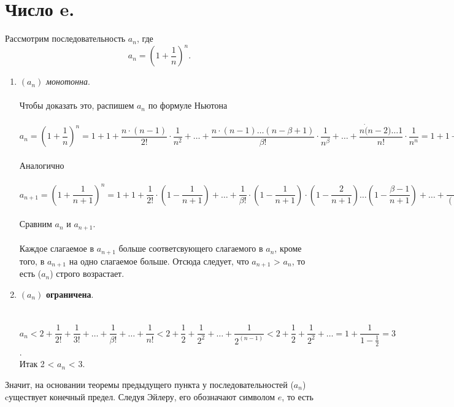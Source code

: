 \section{Число e.}
Рассмотрим последовательность $a_{n}$, где
$$a_{n} = (1 + \dfrac{1}{n})^n.$$
\begin{enumerate}
	\item $(a_{n})$ \textit{монотонна}.\\\\ Чтобы доказать это, распишем $a_{n}$ по формуле Ньютона\\
	\\$a_{n} = (1 + \dfrac{1}{n})^n  = 1 + 1 + \dfrac{n\cdot(n -1)}{2!}\cdot\dfrac{1}{n^2} + \ldots + \dfrac{n\cdot(n - 1)\dots(n- \beta + 1)}{\beta!}\cdot\dfrac{1}{n^\beta} + \ldots + \dfrac{n\dot(n-2)\dots 1}{n!}\cdot\dfrac{1}{n^n} = 1 + 1 + \dfrac{1}{2!} \cdot(1 - \dfrac{1}{n}) + \ldots + \dfrac{1}{\beta!}\cdot(1-\dfrac{1}{n})\cdot(1-\dfrac{2}{n})\dots(1-\dfrac{\beta - 1}{n}) + \ldots + \dfrac{1}{n!}\cdot(1-\dfrac{1}{n})\cdot(1-\dfrac{2}{n}) \dots (1-\dfrac{n - 1}{n})$\\
	\\
	Аналогично\\
	\\$a_{n+1} =(1 + \dfrac{1}{n + 1})^n = 1 + 1 + \dfrac{1}{2!} \cdot(1 - \dfrac{1}{n + 1}) + \ldots + \dfrac{1}{\beta!}\cdot(1-\dfrac{1}{n + 1})\cdot(1-\dfrac{2}{n + 1})\dots(1-\dfrac{\beta - 1}{n + 1}) + \ldots + \dfrac{1}{(n + 1)!}\cdot(1-\dfrac{1}{n + 1}) \dots (1-\dfrac{n}{n +1}) $\\
	\\
	Сравним $a_{n}$ и $a_{n + 1}$.\\\\
	Каждое слагаемое в $a_{n + 1}$ больше соответсвующего слагаемого в $a_{n}$, кроме того, в $a_{n + 1}$ на одно слагаемое больше. Отсюда следует, что $a_{n + 1} $ > $a_{n}$, то есть ($a_{n}$) строго возрастает.
	\item $(a_{n})$ \textbf{ограничена}.\\\\
	\\$a_{n} < 2 + \dfrac{1}{2!} + \dfrac{1}{3!} + \dots + \dfrac{1}{\beta!} + \dots + \dfrac{1}{n!} < 2 + \dfrac{1}{2} + \dfrac{1}{2^2}+ \ldots + \dfrac{1}{2^{(n - 1)}} < 2 + \dfrac{1}{2} + \dfrac{1}{2^2} + \ldots = 1 + \dfrac{1}{1- \frac{1}{2}} = 3$.\\
	Итак 2 < $a_{n }$ < 3.\\
\end{enumerate}
Значит, на основании теоремы предыдущего пункта у последовательностей ($a_{n}$) cуществует конечный предел. Следуя Эйлеру, его обозначают символом $e$, то есть
